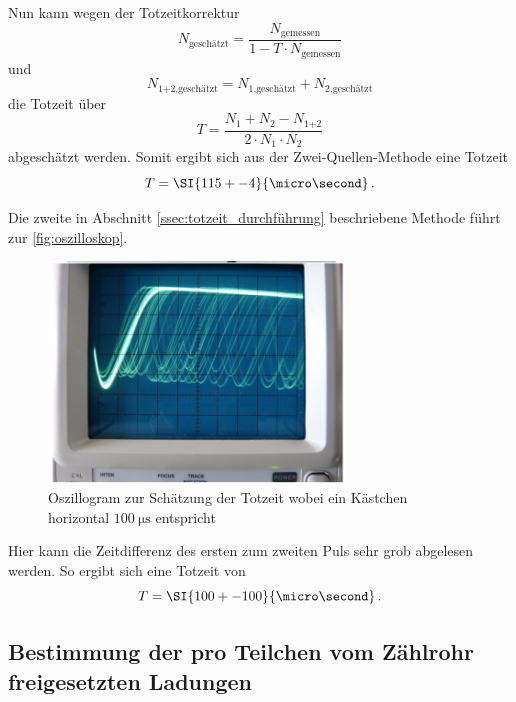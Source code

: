 Nun kann wegen der Totzeitkorrektur
\begin{equation}
    N_\text{geschätzt} = \frac{N_\text{gemessen}}{1-T \cdot N_\text{gemessen}}
\end{equation}
und
\begin{equation}
    N_\text{1+2,geschätzt} = N_\text{1,geschätzt} + N_\text{2,geschätzt}
\end{equation}
die Totzeit über
\begin{equation}
    T = \frac{N_1 + N_2 - N_\text{1+2}}{2 \cdot N_1 \cdot N_2}
\end{equation}
abgeschätzt werden.
Somit ergibt sich aus der Zwei-Quellen-Methode eine Totzeit 
\begin{equation*}
    T = \SI{115+-4}{\micro\second} \, .
\end{equation*}

Die zweite in Abschnitt \ref{ssec:totzeit_durchführung} beschriebene Methode führt zur \autoref{fig:oszilloskop}. 
\begin{figure}
    \centering
    \includegraphics[width=0.7\textwidth]{images/oszilloskop.png}
    \caption{Oszillogram zur Schätzung der Totzeit wobei ein Kästchen horizontal $\SI{100}{\micro\second}$ entspricht}
    \label{fig:oszilloskop}
\end{figure}
Hier kann die Zeitdifferenz des ersten zum zweiten Puls sehr grob abgelesen werden.
So ergibt sich eine Totzeit von
\begin{equation*}
    T = \SI{100+-100}{\micro\second} \, .
\end{equation*}


\subsection{Bestimmung der pro Teilchen vom Zählrohr freigesetzten Ladungen}
\label{ssec:ladungen_auswertung}

